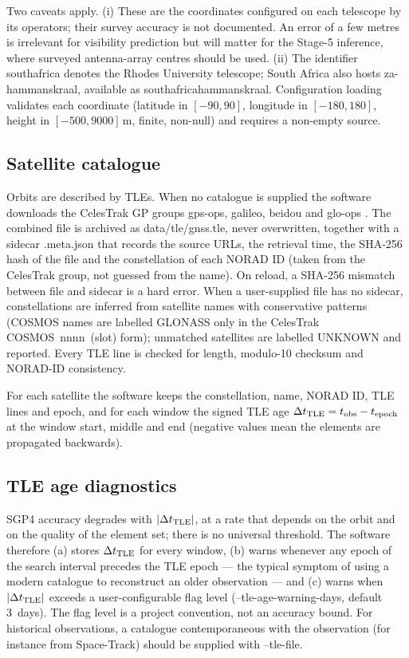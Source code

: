 \documentclass[11pt,a4paper]{article}
\newcommand{\code}[1]{{\ttfamily\def\_{\textunderscore\allowbreak}#1}}
\begin{document}
Two caveats apply. (i) These are the coordinates configured on each
telescope by its operators; their survey accuracy is not documented. An
error of a few metres is irrelevant for visibility prediction but will matter
for the Stage-5 inference, where surveyed antenna-array centres should be
used. (ii) The identifier \code{south\_africa} denotes the Rhodes University
telescope; South Africa also hosts \code{za-hammanskraal}, available as
\code{south\_africa\_hammanskraal}. Configuration loading validates each
coordinate (latitude in $[-90,90]$, longitude in $[-180,180]$, height in
$[-500,9000]$\,m, finite, non-null) and requires a non-empty \code{source}.

\subsection{Satellite catalogue}

Orbits are described by TLEs. When no catalogue is supplied the software
downloads the CelesTrak GP groups \code{gps-ops}, \code{galileo},
\code{beidou} and \code{glo-ops} \cite{celestrak}. The combined file is
archived as \code{data/tle/gnss\_<retrieval time>.tle}, never overwritten,
together with a sidecar \code{.meta.json} that records the source URLs, the
retrieval time, the SHA-256 hash of the file and the constellation of each
NORAD ID (taken from the CelesTrak group, not guessed from the name). On
reload, a SHA-256 mismatch between file and sidecar is a hard error. When a
user-supplied file has no sidecar, constellations are inferred from
satellite names with conservative patterns (\code{COSMOS} names are labelled
GLONASS only in the CelesTrak \code{COSMOS~nnnn~(slot)} form); unmatched
satellites are labelled \code{UNKNOWN} and reported. Every TLE line is checked
for length, modulo-10 checksum and NORAD-ID consistency.

For each satellite the software keeps the constellation, name, NORAD ID, TLE
lines and epoch, and for each window the signed TLE age
$\Delta t_{\rm TLE}=t_{\rm obs}-t_{\rm epoch}$ at the window start, middle
and end (negative values mean the elements are propagated backwards).

\subsection{TLE age diagnostics}

SGP4 accuracy degrades with $|\Delta t_{\rm TLE}|$, at a rate that depends on
the orbit and on the quality of the element set; there is no universal
threshold. The software therefore (a) stores $\Delta t_{\rm TLE}$ for every
window, (b) warns whenever any epoch of the search interval precedes the TLE
epoch --- the typical symptom of using a modern catalogue to reconstruct an
older observation --- and (c) warns when $|\Delta t_{\rm TLE}|$ exceeds a
user-configurable flag level (\code{--tle-age-warning-days}, default 3~days).
The flag level is a project convention, not an accuracy bound. For
historical observations, a catalogue contemporaneous with the observation
(for instance from Space-Track) should be supplied with \code{--tle-file}.
\end{document}
